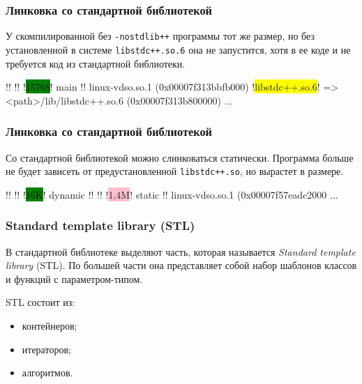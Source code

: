 \documentclass[compress, 8pt, aspectratio=169]{beamer}
\begin{document}
  \begin{frame}[fragile]

    \frametitle{Линковка со стандартной библиотекой}

    У скомпилированной без \verb|-nostdlib++| программы тот же размер,
    но без установленной в системе \verb|libstdc++.so.6| она не запустится,
    хотя в ее коде и не требуется код из стандартной библиотеки.

    \begin{terminalwindow}
!!
!!
!\colorbox{green}{15768}!   main
!!
linux-vdso.so.1 (0x00007f313bbfb000)
!\colorbox{yellow}{libstdc++.so.6}! => <path>/lib/libstdc++.so.6 (0x00007f313b800000)
...
    \end{terminalwindow}

  \end{frame}

  \begin{frame}[fragile]

    \frametitle{Линковка со стандартной библиотекой}

    Со стандартной библиотекой можно слинковаться статически.
    Программа больше не будет зависеть от предустановленной \verb|libstdc++.so|,
    но вырастет в размере.

    \begin{terminalwindow}
!!
!!
!\colorbox{green}{16K}!     dynamic
!!
!!
!\colorbox{pink}{1,4M}!    static
!!
linux-vdso.so.1 (0x00007f57eadc2000
...
    \end{terminalwindow}

  \end{frame}

  \begin{frame}[fragile]

    \frametitle{Standard template library (STL)}

    В стандартной библиотеке выделяют часть, которая называется
    \textit{Standard template library}\footnotemark{} (STL).
    По большей части она представляет собой набор шаблонов классов и функций
    с параметром-типом.


    \hfill \break
    STL состоит из:

    \begin{itemize}
      \item контейнеров;
      \item итераторов;
      \item алгоритмов.
    \end{itemize}

  \end{frame}
\end{document}

